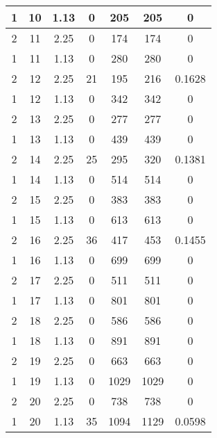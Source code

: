 \documentclass[letterpaper, 12pt]{article}
\begin{document}
\begin{longtable}{|c|c|c|c|c|c|c|}
\hline
1 & 10 & 1.13 & 0 & 205 & 205 & 0 \\
\hline
2 & 11 & 2.25 & 0 & 174 & 174 & 0 \\
\hline
1 & 11 & 1.13 & 0 & 280 & 280 & 0 \\
\hline
2 & 12 & 2.25 & 21 & 195 & 216 & 0.1628 \\
\hline
1 & 12 & 1.13 & 0 & 342 & 342 & 0 \\
\hline
2 & 13 & 2.25 & 0 & 277 & 277 & 0 \\
\hline
1 & 13 & 1.13 & 0 & 439 & 439 & 0 \\
\hline
2 & 14 & 2.25 & 25 & 295 & 320 & 0.1381 \\
\hline
1 & 14 & 1.13 & 0 & 514 & 514 & 0 \\
\hline
2 & 15 & 2.25 & 0 & 383 & 383 & 0 \\
\hline
1 & 15 & 1.13 & 0 & 613 & 613 & 0 \\
\hline
2 & 16 & 2.25 & 36 & 417 & 453 & 0.1455 \\
\hline
1 & 16 & 1.13 & 0 & 699 & 699 & 0 \\
\hline
2 & 17 & 2.25 & 0 & 511 & 511 & 0 \\
\hline
1 & 17 & 1.13 & 0 & 801 & 801 & 0 \\
\hline
2 & 18 & 2.25 & 0 & 586 & 586 & 0 \\
\hline
1 & 18 & 1.13 & 0 & 891 & 891 & 0 \\
\hline
2 & 19 & 2.25 & 0 & 663 & 663 & 0 \\
\hline
1 & 19 & 1.13 & 0 & 1029 & 1029 & 0 \\
\hline
2 & 20 & 2.25 & 0 & 738 & 738 & 0 \\
\hline
1 & 20 & 1.13 & 35 & 1094 & 1129 & 0.0598 \\
\hline
\end{longtable}
\end{document}
